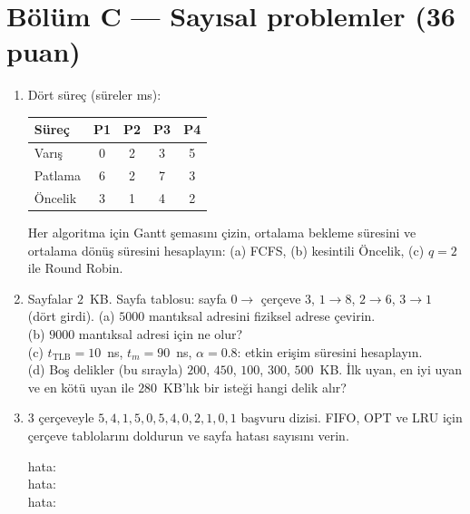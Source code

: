 \section*{Bölüm C --- Sayısal problemler \hfill (36 puan)}
\begin{enumerate}[leftmargin=1.8em,label=C\arabic*.]
  \item Dört süreç (süreler ms):
  \begin{center}
  \begin{tabular}{lcccc}
  \toprule
  Süreç & P1 & P2 & P3 & P4 \\ \midrule
  Varış & 0 & 2 & 3 & 5 \\
  Patlama & 6 & 2 & 7 & 3 \\
  Öncelik & 3 & 1 & 4 & 2 \\ \bottomrule
  \end{tabular}
  \end{center}
  Her algoritma için Gantt şemasını çizin, ortalama bekleme süresini ve ortalama dönüş süresini hesaplayın: (a) FCFS, (b) kesintili Öncelik, (c) $q = 2$ ile Round Robin. 
  \ans{4.6cm}
  \item Sayfalar $2$~KB. Sayfa tablosu: sayfa $0 \to$ çerçeve $3$, $1 \to 8$, $2 \to 6$, $3 \to 1$ (dört girdi).
  (a) $5000$ mantıksal adresini fiziksel adrese çevirin. \\
  (b) $9000$ mantıksal adresi için ne olur? \\
  (c) $t_{\text{TLB}} = 10$~ns, $t_m = 90$~ns, $\alpha = 0.8$: etkin erişim süresini hesaplayın. \\
  (d) Boş delikler (bu sırayla) $200$, $450$, $100$, $300$, $500$~KB. İlk uyan, en iyi uyan ve en kötü uyan ile $280$~KB'lık bir isteği hangi delik alır? 
  \ans{5.2cm}
  \item $3$ çerçeveyle $5, 4, 1, 5, 0, 5, 4, 0, 2, 1, 0, 1$ başvuru dizisi. FIFO, OPT ve LRU için çerçeve tablolarını doldurun ve sayfa hatası sayısını verin. 
  \begin{center}
  \small\renewcommand{\arraystretch}{1.2}
  \quad hata: \underline{\hspace{1.2cm}}\\[0.5em]
  \quad hata: \underline{\hspace{1.2cm}}\\[0.5em]
  \quad hata: \underline{\hspace{1.2cm}}
  \end{center}

\end{enumerate}
